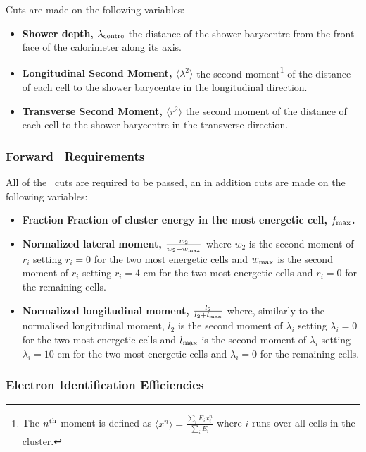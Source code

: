 Cuts are made on the following variables:

\begin{itemize}
    \item {\bf Shower depth, $\lambda_{\rm centre}$} the distance of the shower
    barycentre from the front face of the calorimeter along its axis.  
    \item {\bf Longitudinal Second Moment, $\langle \lambda^2 \rangle$} the second
    moment\footnote{The $n^{\rm th}$ moment is defined as $\langle x^n \rangle =
    \frac{\sum_{i} E_i x^n_i}{\sum_{i} E_i}$ where $i$ runs over all cells in the
    cluster.} of the distance of each cell to
    the shower barycentre in the longitudinal direction.  
    \item {\bf Transverse Second Moment, $\langle r^2 \rangle$} the second moment of the 
    distance of each cell to the shower barycentre in the transverse direction.
\end{itemize}

\subsubsection{Forward \tight\ Requirements}

All of the \loose\ cuts are required to be passed, an in addition cuts are made
on the following variables:

\begin{itemize}
    \item {\bf Fraction Fraction of cluster energy in the most energetic cell,
    $f_{\rm max}$.}
    \item {\bf Normalized lateral moment, $\frac{w_{2}}{w_{2} + w_{\rm max}}$} where
    $w_{2}$ is the second moment of $r_{i}$ setting $r_{i} = 0$ for the two most
    energetic cells and $w_{\rm max}$ is the second moment of $r_{i}$ setting
    $r_{i} = 4$ cm for the two most energetic cells and $r_{i} = 0$ for the
    remaining cells.
    \item {\bf Normalized longitudinal moment, $\frac{l_{2}}{l_{2} + l_{\rm
    max}}$}
    where, similarly to the normalised longitudinal moment, 
    $l_{2}$ is the second moment of $\lambda_{i}$ setting $\lambda_{i} = 0$ for the two most
    energetic cells and $l_{\rm max}$ is the second moment of $\lambda_{i}$ setting
    $\lambda_{i} = 10$ cm for the two most energetic cells and $\lambda_{i} = 0$ for the
    remaining cells.
\end{itemize}

\subsubsection{Electron Identification Efficiencies}

